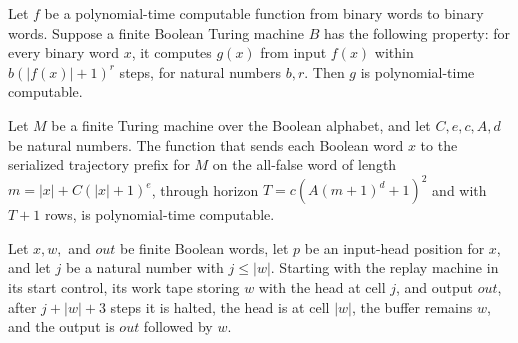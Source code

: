 \begin{lemma}
\label{Complexity.clNative_image}
\leanok
{}
Let $f$ be a polynomial-time computable function from binary words to binary words.
Suppose a finite Boolean Turing machine $B$ has the following property: for every binary
word $x$, it computes $g(x)$ from input $f(x)$ within $b(|f(x)|+1)^r$ steps, for natural
numbers $b,r$. Then $g$ is polynomial-time computable.
\end{lemma}

\begin{lemma}
\label{Complexity.clRecords_native}
\leanok
{}
Let $M$ be a finite Turing machine over the Boolean alphabet, and let $C,e,c,A,d$ be
natural numbers. The function that sends each Boolean word $x$ to the serialized
trajectory prefix for $M$ on the all-false word of length $m=|x|+C(|x|+1)^e$, through
horizon $T=c(A(m+1)^d+1)^2$ and with $T+1$ rows, is polynomial-time computable.
\end{lemma}

\begin{lemma}
\label{Complexity.clReplay_from}
\leanok
{}
Let $x,w,$ and $out$ be finite Boolean words, let $p$ be an input-head position for $x$,
and let $j$ be a natural number with $j\le |w|$. Starting with the replay machine in its
start control, its work tape storing $w$ with the head at cell $j$, and output $out$,
after $j+|w|+3$ steps it is halted, the head is at cell $|w|$, the buffer remains $w$,
and the output is $out$ followed by $w$.
\end{lemma}

